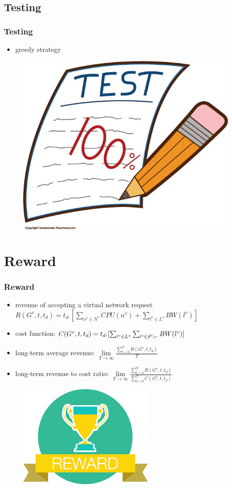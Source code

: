 \documentclass{beamer}
\begin{document}
\subsection{Testing}
\begin{frame}
\frametitle{Testing}
	\begin{itemize}
		\item {greedy strategy}
	\end{itemize}
\begin{figure}
	\centering
	\includegraphics[width=0.4\linewidth]{../Images/Test2}
	\label{fig:test2}
\end{figure}

\end{frame}
\section{Reward}
\begin{frame}
\frametitle{Reward}
	\begin{itemize}
		\item {revenue of accepting a virtual network request $R(G^v,t,t_d)=t_d.[\sum_{n^v \in N^v}CPU(n^v)+\sum_{l^v \in L^v}BW(l^v)]$}
		\item {cost function: $C(G^v,t,t_d)=t_d.[\sum_{l^v \in L^v} \sum _{l^s \in P`_{l^v}}BW(l^v)]$}
		\item {long-term average revenue: $\lim\limits_{T \to \infty}\frac{\sum_{t=0}^TR(G^v,t,t_d)}{T}$}
		\item{long-term revenue to cost
			ratio: $\lim\limits_{T \to \infty} \frac{\sum_{t=0}^TR(G^v,t,t_d)}{\sum_{t=0}^TC(G^v,t,t_d)}$ }
	\end{itemize}
\begin{figure}
	\centering
	\includegraphics[width=0.3\linewidth]{../Images/reward}
	\label{fig:reward}
\end{figure}

\end{frame}
\end{document}
